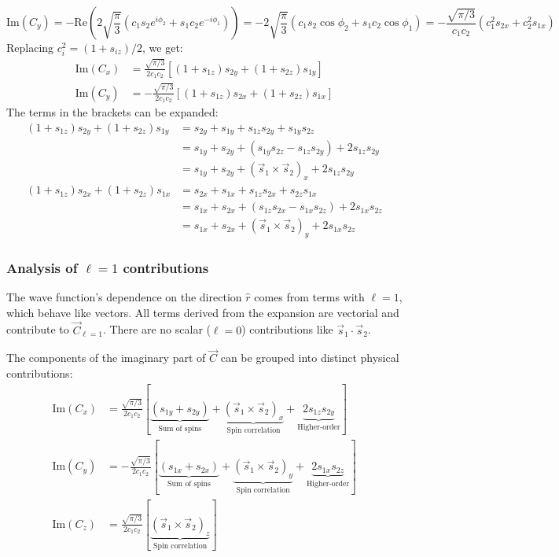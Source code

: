 \documentclass[12pt]{article}
\begin{document}
	\[
	\text{Im}(C_y) = -\text{Re}\left(2\sqrt{\frac{\pi}{3}} (c_1s_2e^{i\phi_2} + s_1c_2e^{-i\phi_1})\right) = -2\sqrt{\frac{\pi}{3}}(c_1s_2\cos\phi_2 + s_1c_2\cos\phi_1) = -\frac{\sqrt{\pi/3}}{c_1c_2}(c_1^2s_{2x} + c_2^2s_{1x})
	\]
	Replacing $c_i^2 = (1+s_{iz})/2$, we get:
	\begin{align*}
	\text{Im}(C_x) &= \frac{\sqrt{\pi/3}}{2c_1c_2} \left[ (1+s_{1z})s_{2y} + (1+s_{2z})s_{1y} \right] \\
	\text{Im}(C_y) &= -\frac{\sqrt{\pi/3}}{2c_1c_2} \left[ (1+s_{1z})s_{2x} + (1+s_{2z})s_{1x} \right]
	\end{align*}
	The terms in the brackets can be expanded:
	\begin{align*}
	(1+s_{1z})s_{2y} + (1+s_{2z})s_{1y} &= s_{2y} + s_{1y} + s_{1z}s_{2y} + s_{1y}s_{2z} \\
	&= s_{1y} + s_{2y} + (s_{1y}s_{2z} - s_{1z}s_{2y}) + 2 s_{1z}s_{2y} \\
	&= s_{1y} + s_{2y} + (\vec{s}_1 \times \vec{s}_2)_x + 2 s_{1z}s_{2y} \\
	(1+s_{1z})s_{2x} + (1+s_{2z})s_{1x} &= s_{2x} + s_{1x} + s_{1z}s_{2x} + s_{2z}s_{1x} \\
	&= s_{1x}+s_{2x} + (s_{1z}s_{2x} - s_{1x}s_{2z}) + 2 s_{1x}s_{2z} \\
	&= s_{1x}+s_{2x} + (\vec{s}_1 \times \vec{s}_2)_y + 2 s_{1x}s_{2z}
	\end{align*}
	
	\subsubsection{Analysis of $\ell=1$ contributions}
	
	The wave function's dependence on the direction $\hat{r}$ comes from terms with $\ell=1$, which behave like vectors. All terms derived from the expansion are vectorial and contribute to $\vec{C}_{\ell=1}$. There are no scalar ($\ell=0$) contributions like $\vec{s}_1 \cdot \vec{s}_2$.
	
	The components of the imaginary part of $\vec{C}$ can be grouped into distinct physical contributions:
	\begin{align*}
	\text{Im}(C_x) &= \frac{\sqrt{\pi/3}}{2c_1c_2} \left[ \underbrace{(s_{1y} + s_{2y})}_{\text{Sum of spins}} + \underbrace{(\vec{s}_1 \times \vec{s}_2)_x}_{\text{Spin correlation}} + \underbrace{2 s_{1z}s_{2y}}_{\text{Higher-order}} \right] \\
	\text{Im}(C_y) &= -\frac{\sqrt{\pi/3}}{2c_1c_2} \left[ \underbrace{(s_{1x} + s_{2x})}_{\text{Sum of spins}} + \underbrace{(\vec{s}_1 \times \vec{s}_2)_y}_{\text{Spin correlation}} + \underbrace{2 s_{1x}s_{2z}}_{\text{Higher-order}} \right] \\
	\text{Im}(C_z) &= \frac{\sqrt{\pi/3}}{2c_1c_2} \left[ \underbrace{(\vec{s}_1 \times \vec{s}_2)_z}_{\text{Spin correlation}} \right]
	\end{align*}
\end{document}
